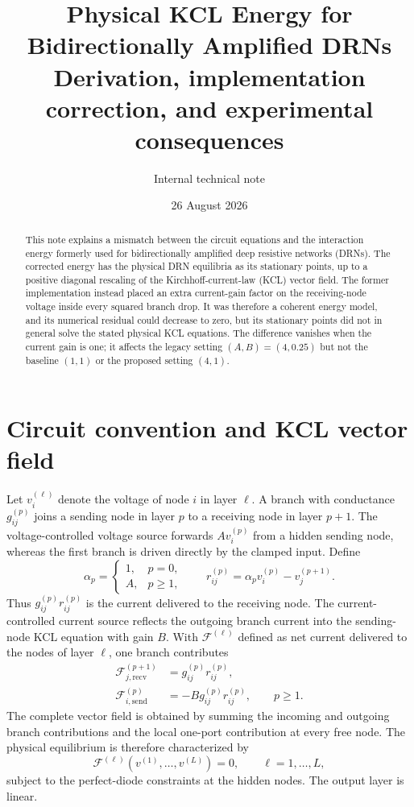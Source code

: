 \documentclass[11pt]{article}
\title{Physical KCL Energy for Bidirectionally Amplified DRNs\\
\large Derivation, implementation correction, and experimental consequences}
\author{Internal technical note}
\date{26 August 2026}
\newcommand{\KCL}{\mathcal{F}}
\begin{document}
\maketitle

\begin{abstract}
This note explains a mismatch between the circuit equations and the interaction
energy formerly used for bidirectionally amplified deep resistive networks
(DRNs).  The corrected energy has the physical DRN equilibria as its stationary
points, up to a positive diagonal rescaling of the Kirchhoff-current-law (KCL)
vector field.  The former implementation instead placed an extra current-gain
factor on the receiving-node voltage inside every squared branch drop.  It was
therefore a coherent energy model, and its numerical residual could decrease to
zero, but its stationary points did not in general solve the stated physical
KCL equations.  The difference vanishes when the current gain is one; it affects
the legacy setting $(A,B)=(4,0.25)$ but not the baseline $(1,1)$ or the proposed
setting $(4,1)$.
\end{abstract}

\section{Circuit convention and KCL vector field}

Let $v_i^{(\ell)}$ denote the voltage of node $i$ in layer $\ell$.  A branch
with conductance $g_{ij}^{(p)}$ joins a sending node in layer $p$ to a receiving
node in layer $p+1$.  The voltage-controlled voltage source forwards
$A v_i^{(p)}$ from a hidden sending node, whereas the first branch is driven
directly by the clamped input.  Define
\begin{equation}
  \alpha_p =
  \begin{cases}
    1, & p=0,\\
    A, & p\geq 1,
  \end{cases}
  \qquad
  r_{ij}^{(p)} = \alpha_p v_i^{(p)}-v_j^{(p+1)}.
  \label{eq:branch-drop}
\end{equation}
Thus $g_{ij}^{(p)}r_{ij}^{(p)}$ is the current delivered to the receiving
node.  The current-controlled current source reflects the outgoing branch
current into the sending-node KCL equation with gain $B$.  With
$\KCL^{(\ell)}$ defined as net current delivered to the nodes of layer $\ell$,
one branch contributes
\begin{align}
  \KCL_{j,\mathrm{recv}}^{(p+1)}
    &= g_{ij}^{(p)}r_{ij}^{(p)},
    \label{eq:kcl-recv}\\
  \KCL_{i,\mathrm{send}}^{(p)}
    &= -B g_{ij}^{(p)}r_{ij}^{(p)}, \qquad p\geq1.
    \label{eq:kcl-send}
\end{align}
The complete vector field is obtained by summing the incoming and outgoing
branch contributions and the local one-port contribution at every free node.
The physical equilibrium is therefore characterized by
\begin{equation}
  \KCL^{(\ell)}\!\left(v^{(1)},\ldots,v^{(L)}\right)=0,
  \qquad \ell=1,\ldots,L,
  \label{eq:kcl-zero}
\end{equation}
subject to the perfect-diode constraints at the hidden nodes.  The output layer
is linear.
\end{document}
